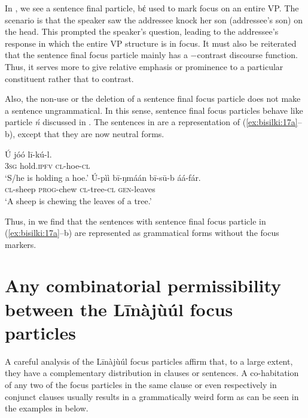 \documentclass[output=paper,colorlinks,citecolor=brown]{langscibook}
\begin{document}
In , we see a sentence final particle, bέ used to mark focus on an entire VP. The scenario is that the speaker  saw the addressee  knock her son (addressee’s son) on the head. This prompted the speaker’s question, leading to the addressee’s response  in which the entire VP structure is in focus. It must also be reiterated that the sentence final focus particle mainly has a −contrast discourse function. Thus, it serves more to give relative emphasis or prominence to a particular constituent rather that to contrast.

Also, the non-use or the deletion of a sentence final focus particle does not make a sentence ungrammatical. In this sense, sentence final focus particles behave like particle \textit{ń} discussed in . The sentences in  are a representation of (\ref{ex:bisilki:17a}--b), except that they are now neutral forms.

\ea%
    \label{ex:bisilki:20}
    \ea\label{ex:bisilki:20a}
    \gll    Ú	jóó		lī-kú-l.\\
            \textsc{3sg}	hold\textsc{.ipfv}	\textsc{cl-}hoe\textsc{-cl}\\
    \glt    ‘S/he is holding a hoe.’
    \ex\label{ex:bisilki:20b}
    \gll    Ú-pìì		bī-ŋmáán	bī-sū-b	áá-fár.\\
            \textsc{cl-}sheep	\textsc{prog-}chew	\textsc{cl-}tree\textsc{-cl}	\textsc{gen-}leaves\\
    \glt    ‘A sheep is chewing the leaves of a tree.’
    \z
\z

Thus, in  we find that the sentences with sentence final focus particle in (\ref{ex:bisilki:17a}--b) are represented as grammatical forms without the focus markers.

\section{Any combinatorial permissibility between the Līnàjùúl focus particles}\label{sec:bisilki:6}

A careful analysis of the Līnàjùúl focus particles affirm that, to a large extent, they have a complementary distribution in clauses or sentences. A co-habitation of any two of the focus particles in the same clause or even respectively in conjunct clauses usually results in a grammatically weird form as can be seen in the examples in  below.
\end{document}
